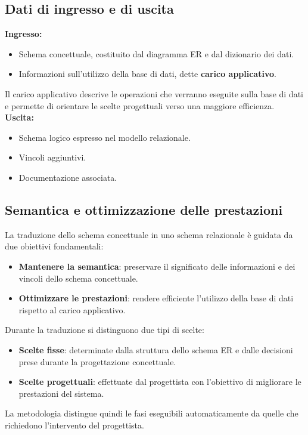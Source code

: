 \subsection*{Dati di ingresso e di uscita}
\textbf{Ingresso:}
\begin{itemize}
    \item Schema concettuale, costituito dal diagramma ER
    e dal dizionario dei dati.
    \item Informazioni sull'utilizzo della base di dati,
    dette \textbf{carico applicativo}.
\end{itemize}
\noindent
Il carico applicativo descrive le operazioni che verranno
eseguite sulla base di dati e permette di orientare
le scelte progettuali verso una maggiore efficienza.\\
\textbf{Uscita:}
\begin{itemize}
    \item Schema logico espresso nel modello relazionale.
    \item Vincoli aggiuntivi.
    \item Documentazione associata.
\end{itemize}
\noindent
\subsection*{Semantica e ottimizzazione delle prestazioni}
La traduzione dello schema concettuale in uno schema
relazionale è guidata da due obiettivi fondamentali:
\begin{itemize}
    \item \textbf{Mantenere la semantica}: preservare il significato
    delle informazioni e dei vincoli dello schema concettuale.
    \item \textbf{Ottimizzare le prestazioni}: rendere efficiente
    l'utilizzo della base di dati rispetto al carico applicativo.
\end{itemize}
\noindent
Durante la traduzione si distinguono due tipi di scelte:
\begin{itemize}
    \item \textbf{Scelte fisse}: determinate dalla struttura
    dello schema ER e dalle decisioni prese durante
    la progettazione concettuale.
    \item \textbf{Scelte progettuali}: effettuate dal progettista
    con l'obiettivo di migliorare le prestazioni del sistema.
\end{itemize}
\noindent
La metodologia distingue quindi le fasi eseguibili
automaticamente da quelle che richiedono l'intervento
del progettista.

